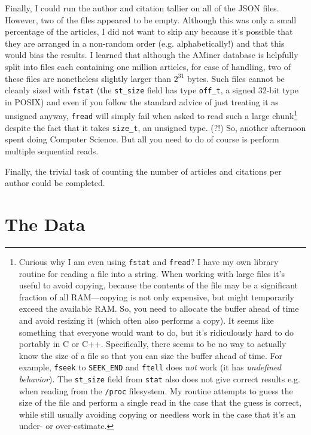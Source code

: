 \documentclass[twocolumn]{article}
\begin{document}
Finally, I could run the author and citation tallier on all of the
JSON files. However, two of the files appeared to be empty. Although
this was only a small percentage of the articles, I did not want to
skip any because it's possible that they are arranged in a non-random
order (e.g. alphabetically!) and that this would bias the results. I
learned that although the AMiner database is helpfully split into
files each containing one million articles, for ease of handling, two
of these files are nonetheless slightly larger than $2^{31}$ bytes. Such
files cannot be cleanly sized with \verb+fstat+ (the \verb+st_size+
field has type \verb+off_t+, a signed 32-bit type in POSIX) and even
if you follow the standard advice of just treating it as unsigned
anyway, \verb+fread+ will simply fail when asked to read such a large
chunk\footnote{
%
  Curious why I am even using {\tt fstat} and {\tt fread}? I have my
  own library routine for reading a file into a string. When working
  with large files it's useful to avoid copying, because the contents
  of the file may be a significant fraction of all RAM---copying is
  not only expensive, but might temporarily exceed the available RAM.
  So, you need to allocate the buffer ahead of time and avoid resizing
  it (which often also performs a copy). It seems like something that
  everyone would want to do, but it's ridiculously hard to do portably
  in C or C++. Specifically, there seems to be no way to actually know
  the size of a file so that you can size the buffer ahead of time.
  For example, {\tt fseek} to {\tt SEEK\_END} and {\tt ftell} does
  {\em not} work (it has {\em undefined behavior}). The {\tt st\_size}
  field from {\tt stat} also does not give correct results e.g. when
  reading from the {\tt /proc} filesystem. My routine attempts to
  guess the size of the file and perform a single read in the case
  that the guess is correct, while still usually avoiding copying or
  needless work in the case that it's an under- or over-estimate.
%
} despite the fact that it takes \verb+size_t+, an unsigned type. (?!)
So, another afternoon spent doing Computer Science. But all you need
to do of course is perform multiple sequential reads.

Finally, the trivial task of counting the number of articles and
citations per author could be completed.

\section{The Data}
\end{document}
